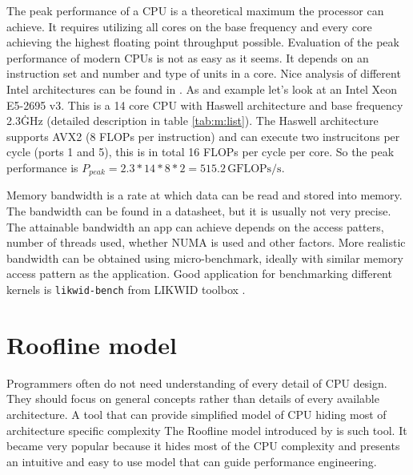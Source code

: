 The peak performance of a CPU is a theoretical maximum the processor can achieve. It requires utilizing all cores on the base frequency and every core achieving the highest floating point throughput possible.
Evaluation of the peak performance of modern CPUs is not as easy as it seems. It depends on an instruction set and number and type of units in a core. Nice analysis of different Intel architectures can be found in \cite{dolbeau-2018}.
As and example let's look at an Intel Xeon E5-2695 v3. This is a 14 core CPU with Haswell architecture and base frequency 2.3\.GHz (detailed description in table \ref{tab:m:list}). The Haswell architecture supports AVX2 (8 FLOPs per instruction) and can execute two instrucitons per cycle (ports 1 and 5), this is in total 16 FLOPs per cycle per core.
So the peak performance is $P_{peak} = 2.3 * 14 * 8 * 2 = 515.2\,\textrm{GFLOPs/s}$.

Memory bandwidth is a rate at which data can be read and stored into memory.
The bandwidth can be found in a datasheet, but it is usually not very precise. The attainable bandwidth an app can achieve depends on the access patters, number of threads used, whether NUMA is used and other factors. 
More realistic bandwidth can be obtained using micro-benchmark, ideally with similar memory access pattern as the application.
Good application for benchmarking different kernels is \texttt{likwid-bench} from LIKWID toolbox .

\section{Roofline model}

Programmers often do not need understanding of every detail of CPU design. They should focus on general concepts rather than details of every available architecture. A tool that can provide simplified model of CPU hiding most of architecture specific complexity \todol{} 
The Roofline model introduced by \cite{williams-2009} is such tool. It became very popular because it hides most of the CPU complexity and presents an intuitive and easy to use model that can guide performance engineering.


